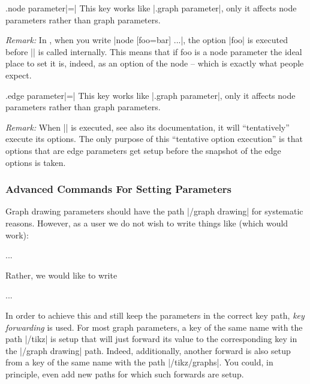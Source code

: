 \begin{handler}{{.node parameter}|=|}
  This key works like |.graph parameter|, only it
  affects node parameters rather than graph parameters.

  \emph{Remark:} In \tikzname, when you write |node [foo=bar] {...}|,
  the option |foo| is executed before |\pgfnode| is called
  internally. This means that if foo is a node parameter the ideal
  place to set it is, indeed, as an option of the node -- which is
  exactly what people expect.
\end{handler}

\begin{handler}{{.edge parameter}|=|}
  This key works like |.graph parameter|, only it
  affects node parameters rather than graph parameters.

  \emph{Remark:} When |\pgfgdedge| is executed, see also its
  documentation, it will ``tentatively'' execute its options. The only
  purpose of this ``tentative option execution'' is that options that
  are edge parameters get setup before the snapshot of the edge
  options is taken.  
\end{handler}




\subsubsection{Advanced Commands For Setting Parameters}

Graph drawing parameters should have the path
|/graph drawing| for systematic reasons. However, as a user we do not
wish to write things like (which would work):
\begin{codeexample}
\tikz [/graph drawing/algorithm=my algorithm,
       /graph drawing/my algorithm/foo=bar,  
       /graph drawing/blub=foobar] ...
\end{codeexample}
Rather, we would like to write
\begin{codeexample}
\tikz [my algorithm={foo=bar}, blub=foobar] ...
\end{codeexample}


In order to achieve this and still keep the parameters in the correct
key path, \emph{key forwarding} is used. For most graph parameters, a
key of the same name with the path |/tikz| is setup that will just
forward its value to the corresponding key in the |/graph drawing|
path. Indeed, additionally, another forward is also setup from a key
of the same name with the path |/tikz/graphs|. You could, in
principle, even add new paths for which such forwards are setup.

